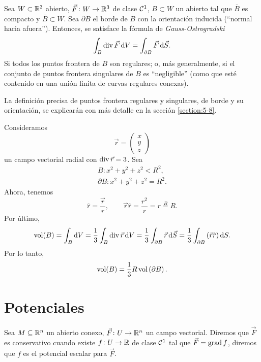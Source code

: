 \begin{teo}
    Sea $W \subset \mathbb{R}^3$ abierto, $\vec{F} \colon W \to \mathbb{R}^3$ de clase $\mathcal{C}^1$, $B \subset W$ un abierto tal que $\bar{B}$ es compacto y $\bar{B} \subset W$.
    Sea $\partial B$ el borde de $B$ con la orientación inducida (``normal hacia afuera''). Entonces, se satisface la fórmula de \emph{Gauss-Ostrogradski}
    \[
        \int_B \diver \vec{F} \dif V = \int_{\partial B} \vec{F} \dif \vec{S}.
    \]
    Si todos los puntos frontera de $B$ son regulares; o, más generalmente, si el conjunto de puntos frontera singulares de $B$ es ``negligible'' (como que est\'e 
    contenido en una unión finita de curvas regulares conexas).
\end{teo}

\begin{obs}
    La definición precisa de puntos frontera regulares y singulares, de borde y su orientación, se explicarán con más detalle en la sección \ref{section:5-8}.
\end{obs}

\begin{example*}
    Consideramos
    \[
        \vec{r} =
        \begin{pmatrix}
            x \\ y \\ z
        \end{pmatrix}
    \]
    un campo vectorial radial con $\operatorname{div} \vec{r} = 3$. Sea
    \begin{gather*}
        B : x^2  + y^2 + z^2 < R^2, \\
        \partial B : x^2 + y^2 + z^2 = R^2.
    \end{gather*}
    Ahora, tenemos
    \[
        \hat{r} = \frac{\vec{r}}{r}, \qquad
        \vec{r} \hat{r} = \frac{r^2}{r} = r \stackrel{B}{=} R.
    \]
    Por último,
    \[
        \vol(B) = \int_B \dif V = \frac{1}{3} \int_B \diver \vec{r} \dif V = \frac{1}{3} \int_{\partial B} \vec{r} \dif \vec{S}
        = \frac{1}{3} \int_{\partial B} \left( \vec{r} \hat{r} \right) \dif S.
    \]
    Por lo tanto,
    \[
        \operatorname{vol}(B) = \frac{1}{3} R \operatorname{vol}\left( \partial B \right).
    \]
\end{example*}

\section{Potenciales}

\begin{defi}
    Sea $M \subseteq \mathbb{R}^n$ un abierto conexo, $\vec{F} \colon U \to \mathbb{R}^n$ un campo vectorial. Diremos que $\vec{F}$ es conservativo
    cuando existe $f \colon U \to \mathbb{R}$ de clase $\mathcal{C}^1$ tal que $\vec{F} = \operatorname{grad} f$, diremos que $f$ es el potencial escalar para $\vec{F}$.
\end{defi}

